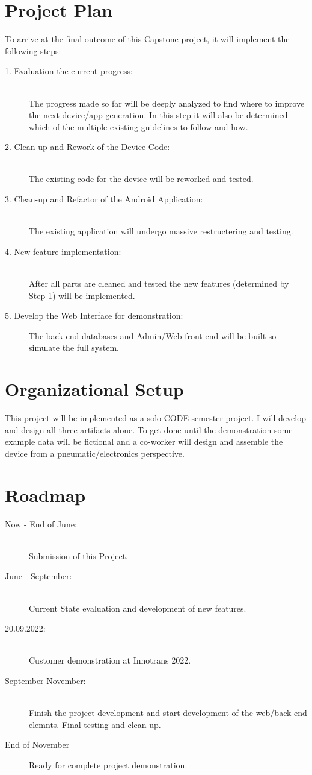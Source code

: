 \documentclass[a4paper,12pt]{article}
\begin{document}
\section*{Project Plan}
To arrive at the final outcome of this Capstone project, it will implement the following steps:
\begin{description}
    \item[1. Evaluation the current progress:] \hfill \\
        The progress made so far will be deeply analyzed to find where to improve the next device/app generation. In this step it will also be determined which of the multiple existing guidelines to follow and how.
    \item[2. Clean-up and Rework of the Device Code:] \hfill \\
        The existing code for the device will be reworked and tested.
    \item[3. Clean-up and Refactor of the Android Application:] \hfill \\
        The existing application will undergo massive restructering and testing.
    \item[4. New feature implementation:] \hfill \\
        After all parts are cleaned and tested the new features (determined by Step 1) will be implemented.
    \item[5. Develop the Web Interface for demonstration:]
        The back-end databases and Admin/Web front-end will be built so simulate the full system.
\end{description}

\section*{Organizational Setup}
This project will be implemented as a solo CODE semester project. I will develop and design all three artifacts alone. To get done until the demonstration some example data will be fictional and a co-worker will design and assemble the device from a pneumatic/electronics perspective.

\section*{Roadmap}
\begin{description}
    \item[Now - End of June:] \hfill \\
        Submission of this Project.
        \item[June - September:]\hfill \\
        Current State evaluation and development of new features.
    \item[20.09.2022:] \hfill \\
        Customer demonstration at Innotrans 2022.
        \item[September-November:]\hfill \\
        Finish the project development and start development of the web/back-end elemnts. Final testing and clean-up.
    \item[End of November]
        Ready for complete project demonstration.
\end{description}
\end{document}
